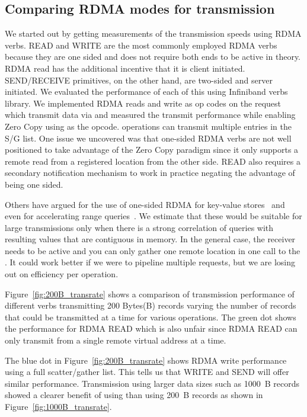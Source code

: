 \subsection{Comparing RDMA modes for transmission}
We started out by getting measurements of the transmission speeds using RDMA verbs.  
READ and WRITE are the most commonly employed RDMA verbs because they are one sided
and does not require both ends to be active in theory. RDMA read has the additional incentive 
that it is client initiated. SEND/RECEIVE primitives, on the other hand, are two-sided and 
server initiated.  We evaluated the performance of each of this using Infiniband verbs library. We implemented 
RDMA reads and write as op codes on the  request which 
transmit data via  and measured the transmit 
performance while enabling Zero Copy using  as the opcode.
 operations can transmit multiple entries in the S/G list.
One issue we uncovered was that one-sided RDMA verbs are not well positioned to 
take advantage of the Zero Copy paradigm since it only supports a remote read 
from a registered location from the other side. READ also requires a secondary notification mechanism 
to work in practice negating the advantage of being one sided.

Others have argued for the use of one-sided RDMA for key-value stores~\cite{pilaf} and even for accelerating 
range queries~\cite{zerocopyrangequery}. We estimate that these would be suitable for large transmissions only when there is a strong 
correlation of queries with resulting values that are contiguous in memory. In the general case, the receiver 
needs to be active and you can only gather one remote location in one call to the .
It could work better if we were to pipeline multiple requests, but we are losing out on efficiency per operation.

Figure~\ref{fig:200B_transrate} shows a comparison of transmission
performance of different verbs transmitting 200 Bytes(B) records varying the number of records
that could be transmitted at a time for various operations. The green dot shows
the performance for RDMA READ which is also unfair since RDMA READ can only transmit from a single remote virtual address at a time.

The blue dot in Figure~\ref{fig:200B_transrate} shows RDMA write performance using a full scatter/gather list. This tells us that WRITE and SEND will offer 
similar performance. Transmission using larger data sizes such as 1000~B records showed a clearer benefit of using  than 
using 200~B records as shown in Figure~\ref{fig:1000B_transrate}. 

